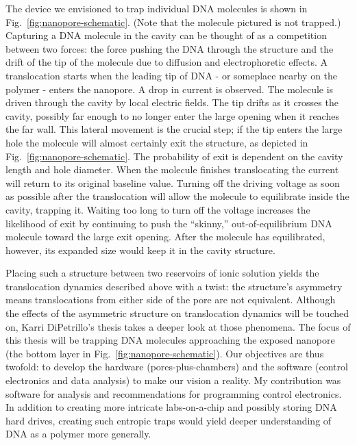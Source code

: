 \documentclass[aps,prl,preprint,groupedaddress]{revtex4}
\begin{document}
The device we envisioned to trap individual DNA molecules is shown in Fig.~\ref{fig:nanopore-schematic}. (Note that the molecule pictured is not trapped.) Capturing a DNA molecule in the cavity can be thought of as a competition between two forces: the force pushing the DNA through the structure and the drift of the tip of the molecule due to diffusion and electrophoretic effects. A translocation starts when the leading tip of DNA  - or someplace nearby on the polymer - enters the nanopore. A drop in current is observed. The molecule is driven through the cavity by local electric fields. The tip drifts as it crosses the cavity, possibly far enough to no longer enter the large opening when it reaches the far wall. This lateral movement is the crucial step; if the tip enters the large hole the molecule will almost certainly exit the structure, as depicted in Fig.~\ref{fig:nanopore-schematic}. The probability of exit is dependent on the cavity length and hole diameter. When the molecule finishes translocating the current will return to its original baseline value. Turning off the driving voltage as soon as possible after the translocation will allow the molecule to equilibrate inside the cavity, trapping it. Waiting too long to turn off the voltage increases the likelihood of exit by continuing to push the “skinny,” out-of-equilibrium DNA molecule toward the large exit opening. After the molecule has equilibrated, however, its expanded size would keep it in the cavity structure. 

Placing such a structure between two reservoirs of ionic solution yields the translocation dynamics described above with a twist: the structure’s asymmetry means translocations from either side of the pore are not equivalent. Although the effects of the asymmetric structure on translocation dynamics will be touched on, Karri DiPetrillo’s thesis takes a deeper look at those phenomena. The focus of this thesis will be trapping DNA molecules approaching the exposed nanopore (the bottom layer in Fig.~\ref{fig:nanopore-schematic}). Our objectives are thus twofold: to develop the hardware (pores-plus-chambers) and the software (control electronics and data analysis) to make our vision a reality. My contribution was software for analysis and recommendations for programming control electronics. In addition to creating more intricate labs-on-a-chip and possibly storing DNA hard drives, creating such entropic traps would yield deeper understanding of DNA as a polymer more generally. 
\end{document}
